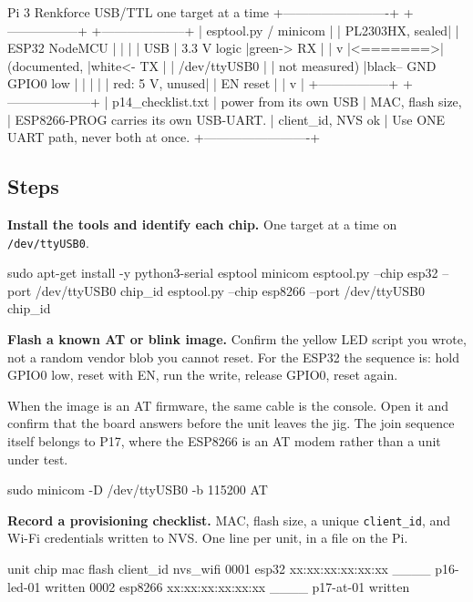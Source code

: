 \begin{asciiart}
  Pi 3                                Renkforce USB/TTL       one target at a time
  +-------------------------+         +-----------------+     +--------------------+
  | esptool.py / minicom    |         | PL2303HX, sealed|     |  ESP32 NodeMCU     |
  |   |                     |  USB    | 3.3 V logic     |green-> RX                |
  |   v                     |<=======>| (documented,    |white<- TX                |
  | /dev/ttyUSB0            |         |  not measured)  |black-- GND GPIO0 low     |
  |   |                     |         | red: 5 V, unused|     |  EN reset          |
  |   v                     |         +-----------------+     +--------------------+
  | p14_checklist.txt       |                                 power from its own USB
  |   MAC, flash size,      |         ESP8266-PROG carries its own USB-UART.
  |   client_id, NVS ok     |         Use ONE UART path, never both at once.
  +-------------------------+
\end{asciiart}

\subsection*{Steps}

\begin{steps}
\item \textbf{Install the tools and identify each chip.} One target at a time on \texttt{/dev/ttyUSB0}.
\begin{shellcode}
sudo apt-get install -y python3-serial esptool minicom
esptool.py --chip esp32 --port /dev/ttyUSB0 chip_id
esptool.py --chip esp8266 --port /dev/ttyUSB0 chip_id
\end{shellcode}

\item \textbf{Flash a known AT or blink image.} Confirm the yellow LED script you wrote, not a random vendor blob you cannot reset. For the ESP32 the sequence is: hold GPIO0 low, reset with EN, run the write, release GPIO0, reset again.

When the image is an AT firmware, the same cable is the console. Open it and confirm that the board answers before the unit leaves the jig. The join sequence itself belongs to P17, where the ESP8266 is an AT modem rather than a unit under test.
\begin{atcode}
sudo minicom -D /dev/ttyUSB0 -b 115200
AT
\end{atcode}

\item \textbf{Record a provisioning checklist.} MAC, flash size, a unique \texttt{client\_id}, and Wi-Fi credentials written to NVS. One line per unit, in a file on the Pi.
\begin{plaincode}
unit   chip      mac                 flash    client_id      nvs_wifi
0001   esp32     xx:xx:xx:xx:xx:xx   ____     p16-led-01     written
0002   esp8266   xx:xx:xx:xx:xx:xx   ____     p17-at-01      written
\end{plaincode}
\end{steps}

